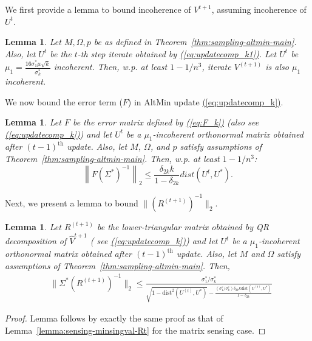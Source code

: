 \documentclass[11pt]{article}
\renewcommand{\eqref}[1]{\hyperref[#1]{(\ref*{#1})}}
\theoremstyle{plain}
\newtheorem{lemma}[theorem]{Lemma}
\theoremstyle{definition}
\newcommand{\eqdef}{\stackrel{\textrm{def}}{=}}
\newcommand{\dist}{\mathrm{dist}}
\newcommand{\twonorm}[1]{\left\| {#1} \right\|_2}
\newcommand{\Vt}{V^{t+1}}
\newcommand{\Vht}{\widehat{V}^{t+1}}
\newcommand{\Ut}{U^{t}}
\newcommand{\Rt}{R^{(t+1)}}
\begin{document}
We first provide a lemma to bound incoherence of $\Vt$, assuming incoherence of $\Ut$. 
\begin{lemma}\label{lemma:completion-incoherence-Vt}
Let $M, \Omega, p$ be as defined in Theorem~\ref{thm:sampling-altmin-main}. Also, let $U^t$ be the $t$-th step iterate obtained by \eqref{eq:updatecomp_k1}. Let $U^t$  be $\mu_1=\frac{16\sigma_1^*\mu\sqrt{k}}{\sigma_k^*}$ incoherent. Then, w.p. at least $1-1/n^3$, iterate $V^{(t+1)}$ is also $\mu_1$ incoherent.%
\end{lemma}
We now bound the error term ($F$) in  AltMin update \eqref{eq:updatecomp_k}. 
\begin{lemma}\label{lemma:Fbound_comp}
  Let $F$ be the error matrix defined by \eqref{eq:F_k} (also see \eqref{eq:updatecomp_k}) and let $\Ut$ be a $\mu_1$-incoherent orthonormal matrix obtained after $(t-1)^{\textrm{th}}$ update. Also, let $M$, $\Omega$, and $p$ satisfy assumptions of Theorem~\ref{thm:sampling-altmin-main}. Then, w.p. at least $1-1/n^3$: 
$$\twonorm{F(\Sigma^*)^{-1}} \leq \frac{\delta_{2k} k }{1-\delta_{2k}}dist(U^t, U^*).$$
\end{lemma}
Next, we present a lemma to bound $\|(\Rt)^{-1}\|_2$. 
\begin{lemma}\label{lemma:Rbound_comp}
  Let $\Rt$ be the lower-triangular matrix obtained by QR decomposition of $\Vht$ ( see \eqref{eq:updatecomp_k}) and let $\Ut$ be a $\mu_1$-incoherent orthonormal matrix obtained after $(t-1)^\textrm{th}$ update. Also, let $M$ and $\Omega$ satisfy assumptions of Theorem~\ref{thm:sampling-altmin-main}. Then,
\begin{align}\label{eqn:completion-minsingval-Rt}
  &\|\Sigma^*(R^{(t+1)})^{-1}\|_2\leq \frac{\sigma^*_1/\sigma^*_k}{\sqrt{1-\dist^2\left(U^{(t)},U^*\right)}-\frac{(\sigma^*_1/\sigma^*_k)\delta_{2k}k\dist(U^{(t)},U^*)}{1-\delta_{2k}}}%
\end{align}
\end{lemma}
\begin{proof}
Lemma follows by exactly the same proof as that of Lemma~\ref{lemma:sensing-minsingval-Rt} for the matrix sensing case. 
\end{proof}
\end{document}
